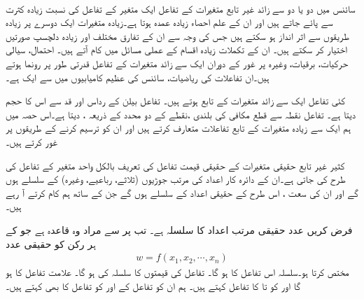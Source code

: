 
\\
سائنس میں دو یا دو سے زائد غیر تابع  متغیرات کے تفاعل    ایک متغیر کے تفاعل کی  نسبت  زیادہ کثرت سے پائے جاتے ہیں اور ان کے علم   احصاء  زیادہ  عمدہ   ہوتا  ہے۔زیادہ متغیرات ایک دوسرے پر زیادہ طریقوں سے اثر انداز ہو سکتے ہیں جس کی وجہ سے ان کے تفارق    مختلف اور زیادہ دلچسپ  صورتیں اختیار  کر سکتے ہیں۔ ان کے تکملات  زیادہ اقسام کے عملی  مسائل میں کام آتے ہیں۔ احتمال،  سیالی حرکیات، برقیات، وغیرہ     پر غور کے دوران  ایک سے زائد متغیرات  کے تفاعل قدرتی طور پر رونما ہوتے ہیں۔ان تفاعلات کی  ریاضیات، سائنس کی عظیم  کامیابیوں میں  سے ایک ہے۔


کئی تفاعل ایک سے زائد متغیرات کے تابع  ہوتے ہیں۔  تفاعل    بیلن کے رداس اور قد سے اس  کا حجم دیتا ہے۔
  تفاعل   نقطہ   سے        قطع مکافی     کی بلندی ،نقطے کے دو محدد  کے ذریعہ  ، دیتا  ہے۔اس حصہ میں ہم ایک سے زیادہ متغیرات کے تابع تفاعلات  متعارف کرتے ہیں  اور ان کو ترسیم کرنے کے طریقوں پر غور کرتے ہیں۔

کثیر غیر تابع حقیقی متغیرات  کے حقیقی قیمت تفاعل کی تعریف  بالکل واحد متغیر کے تفاعل کی طرح کی جاتی ہے۔ان کے دائرہ کار      اعداد کی  مرتب جوڑیوں (ثلاثے، رباعیے، وغیرہ)       کے سلسلے ہوں گے اور ان  کی  سعت  ، اس طرح  کے حقیقی اعداد کے سلسلے ہوں گے جن کے ساتھ ہم کام کرتے آ رہے ہیں۔

فرض کریں  عدد حقیقی مرتب  اعداد  کا سلسلہ  ہے۔  تب  پر   سے مراد وہ قاعدہ ہے جو  کے ہر رکن کو حقیقی عدد
\begin{align*}
w=f(x_1,x_2,\cdots,x_n)
\end{align*}
مختص کرتا ہو۔سلسلہ  اس تفاعل کا  ہو گا۔  تفاعل   کی   قیمتوں کا سلسلہ   کی  ہو گا۔ علامت  تفاعل  کا  ہو گا اور  کو      تا    کا تفاعل کہتے ہیں۔ ہم  ان  کو تفاعل کے  اور  کو تفاعل کا   بھی کہتے ہیں۔

